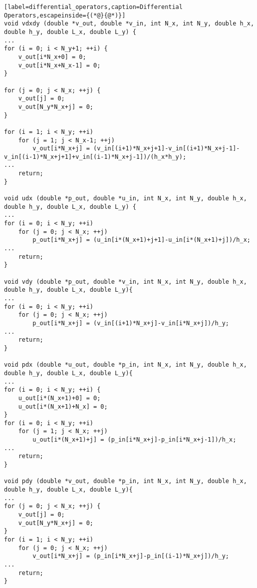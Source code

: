 \documentclass[12pt]{article}
\begin{document}
\begin{lstlisting}[label=differential_operators,caption=Differential Operators,escapeinside={(*@}{@*)}]
void vdxdy (double *v_out, double *v_in, int N_x, int N_y, double h_x, double h_y, double L_x, double L_y) {
...
for (i = 0; i < N_y+1; ++i) {
	v_out[i*N_x+0] = 0;
	v_out[i*N_x+N_x-1] = 0;
}

for (j = 0; j < N_x; ++j) {
	v_out[j] = 0;
	v_out[N_y*N_x+j] = 0;
}

for (i = 1; i < N_y; ++i)
	for (j = 1; j < N_x-1; ++j)
		v_out[i*N_x+j] = (v_in[(i+1)*N_x+j+1]-v_in[(i+1)*N_x+j-1]-v_in[(i-1)*N_x+j+1]+v_in[(i-1)*N_x+j-1])/(h_x*h_y);
...
	return; 
}

void udx (double *p_out, double *u_in, int N_x, int N_y, double h_x, double h_y, double L_x, double L_y) {
...
for (i = 0; i < N_y; ++i)
	for (j = 0; j < N_x; ++j)
		p_out[i*N_x+j] = (u_in[i*(N_x+1)+j+1]-u_in[i*(N_x+1)+j])/h_x;
...
	return; 
}

void vdy (double *p_out, double *v_in, int N_x, int N_y, double h_x, double h_y, double L_x, double L_y){
...
for (i = 0; i < N_y; ++i)
	for (j = 0; j < N_x; ++j)
		p_out[i*N_x+j] = (v_in[(i+1)*N_x+j]-v_in[i*N_x+j])/h_y;
...
	return; 
}

void pdx (double *u_out, double *p_in, int N_x, int N_y, double h_x, double h_y, double L_x, double L_y){
...
for (i = 0; i < N_y; ++i) {
	u_out[i*(N_x+1)+0] = 0;
	u_out[i*(N_x+1)+N_x] = 0;	
}
for (i = 0; i < N_y; ++i)
	for (j = 1; j < N_x; ++j)
		u_out[i*(N_x+1)+j] = (p_in[i*N_x+j]-p_in[i*N_x+j-1])/h_x;
...
	return; 
}

void pdy (double *v_out, double *p_in, int N_x, int N_y, double h_x, double h_y, double L_x, double L_y){
...
for (j = 0; j < N_x; ++j) {
	v_out[j] = 0;
	v_out[N_y*N_x+j] = 0;	
}
for (i = 1; i < N_y; ++i)
	for (j = 0; j < N_x; ++j)
		v_out[i*N_x+j] = (p_in[i*N_x+j]-p_in[(i-1)*N_x+j])/h_y;
...
	return; 
}
\end{lstlisting}
\end{document}
